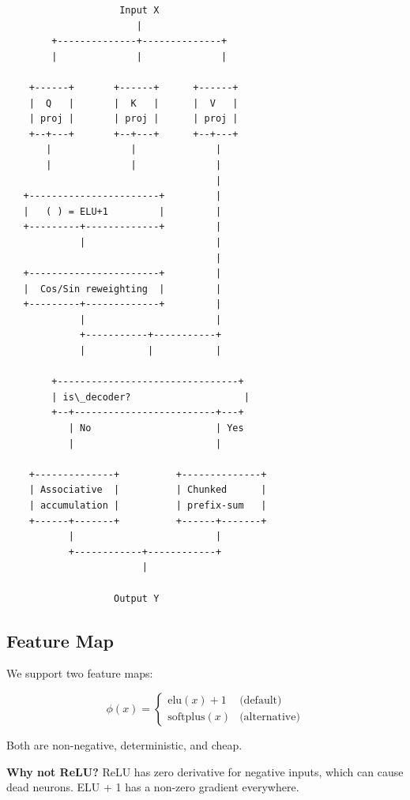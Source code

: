 \begin{lstlisting}
                    Input X
                       |
        +--------------+--------------+
        |              |              |
                                       
    +------+       +------+      +------+
    |  Q   |       |  K   |      |  V   |
    | proj |       | proj |      | proj |
    +--+---+       +--+---+      +--+---+
       |              |              |
       |              |              |
                                     |
   +-----------------------+         |
   |   ( ) = ELU+1         |         |
   +---------+-------------+         |
             |                       |
                                     |
   +-----------------------+         |
   |  Cos/Sin reweighting  |         |
   +---------+-------------+         |
             |                       |
             +-----------+-----------+
             |           |           |
                                      
        +--------------------------------+
        | is\_decoder?                    |
        +--+-------------------------+---+
           | No                      | Yes
           |                         |
                                      
    +--------------+          +--------------+
    | Associative  |          | Chunked      |
    | accumulation |          | prefix-sum   |
    +------+-------+          +------+-------+
           |                         |
           +------------+------------+
                        |
                         
                   Output Y
\end{lstlisting}

\subsection{Feature Map}

We support two feature maps:

\[
\phi(x) = \begin{cases}
\text{elu}(x) + 1 & \text{(default)} \\
\text{softplus}(x) & \text{(alternative)}
\end{cases}
\]

Both are non-negative, deterministic, and cheap.

\textbf{Why not ReLU?} ReLU has zero derivative for negative inputs, which can 
cause dead neurons. ELU + 1 has a non-zero gradient everywhere.


